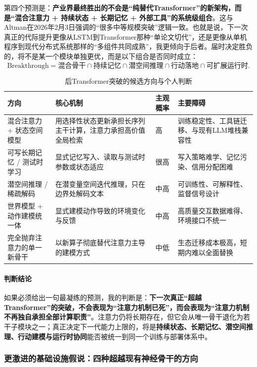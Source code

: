 \documentclass[12pt,a4paper]{article}
\begin{document}
第四个预测是：\textbf{产业界最终胜出的不会是“纯替代Transformer”的新架构，而是“混合注意力 + 持续状态 + 长期记忆 + 外部工具”的系统级组合}。这与Altman在2026年2月3日强调的“很多中等规模突破”逻辑一致。也就是说，下一次真正的代际提升更像从LSTM到Transformer那种“单论文切代”，还是更像从单机程序到现代分布式系统那样的“多组件共同成熟”，我更倾向于后者。届时决定胜负的，将不是某一个模块单独更优，而是以下组合是否同时成立：
\begin{equation}
\text{Breakthrough} =
\text{混合骨干}
\cap \text{持续记忆}
\cap \text{潜空间推理}
\cap \text{行动落地}
\cap \text{可扩展运行时}.
\end{equation}

\begin{table}[H]
\centering
\caption{后Transformer突破的候选方向与个人判断}
\begin{tabular}{p{3.3cm}p{3.0cm}p{2.0cm}p{3.7cm}}
\toprule
\textbf{方向} & \textbf{核心机制} & \textbf{主观概率} & \textbf{主要障碍} \\
\midrule
混合注意力 + 状态空间模型 & 用选择性状态更新承担长序列主干计算，注意力承担高价值全局检索 & 高 & 训练稳定性、工具链迁移、与现有LLM堆栈兼容性 \\
可写长期记忆 / 测试时学习 & 显式记忆写入、读取与测试时参数或状态适应 & 很高 & 写入策略难学、记忆污染、信用分配困难 \\
潜空间推理 / 稀疏解码 & 在潜变量空间迭代推理，只在边界处解码文本 & 中高 & 可训练性、可解释性、监督信号设计 \\
世界模型 + 动作建模统一体 & 显式建模动作导致的环境变化与反馈 & 中高 & 高质量交互数据难得、环境接口不统一 \\
完全抛弃注意力的单一新骨干 & 以新算子彻底替代注意力主导的建模方式 & 中低 & 生态迁移成本极高，短期内难以全面替换 \\
\bottomrule
\end{tabular}
\end{table}

\paragraph{判断结论}

如果必须给出一句最凝练的预测，我的判断是：\textbf{下一次真正“超越Transformer”的突破，不会表现为“注意力机制已死”，而会表现为“注意力机制不再独自承担全部计算职责”}。注意力仍将长期存在，但它会从唯一骨干退化为若干子模块之一；真正决定下一代能力上限的，将是\textbf{持续状态、长期记忆、潜空间推理、行动建模与运行时协同}能否被统一到同一个训练与部署体系中。

\subsubsection{更激进的基础设施假说：四种超越现有神经骨干的方向}
\end{document}
